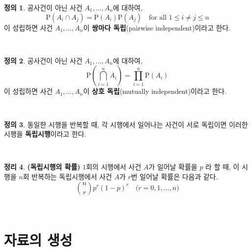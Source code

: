 \documentclass[12pt]{article}
\theoremstyle{definition}
\newtheorem{theorem}{\sffamily 정리}[section]
\theoremstyle{definition}
\newtheorem{definition}[theorem]{\sffamily 정의}
\newcommand{\defn}[1]{\begin{definition}#1\end{definition}~}
\newcommand{\thm}[1]{\begin{theorem}{#1}\end{theorem}~}
\newcommand{\pr}{\text{P}}
\begin{document}
\defn{공사건이 아닌 사건 $A_1, \dots, A_n$에 대하여, $$\pr(A_i\cap A_j) = \pr(A_i)\pr(A_j) \quad \text{for all }1\leq i\neq j\leq n$$
	이 성립하면 사건 $A_1, \dots, A_n$이 \textbf{쌍마다 독립}(pairwise independent)이라고 한다. }

\defn{공사건이 아닌 사건 $A_1, \dots, A_n$에 대하여, $$\pr\left(\bigcap_{i=1}^n A_i\right) = \prod_{i=1}^n \pr(A_i)$$
	이 성립하면 사건 $A_1, \dots, A_n$이 \textbf{상호 독립}(mutually independent)이라고 한다. }

\defn{동일한 시행을 반복할 때, 각 시행에서 일어나는 사건이 서로 독립이면 이러한 시행을 \textbf{독립시행}이라고 한다.}

\thm{\textbf{(독립시행의 확률)} $1$회의 시행에서 사건 $A$가 일어날 확률을 $p$ 라 할 때, 이 시행을 $n$회 반복하는 독립시행에서 사건 $A$가 $r$번 일어날 확률은 다음과 같다. $${n\choose r} p^r(1-p)^r \quad \big(r=0, 1, \dots, n\big)$$}

\pagebreak
\section{자료의 생성}
\end{document}
